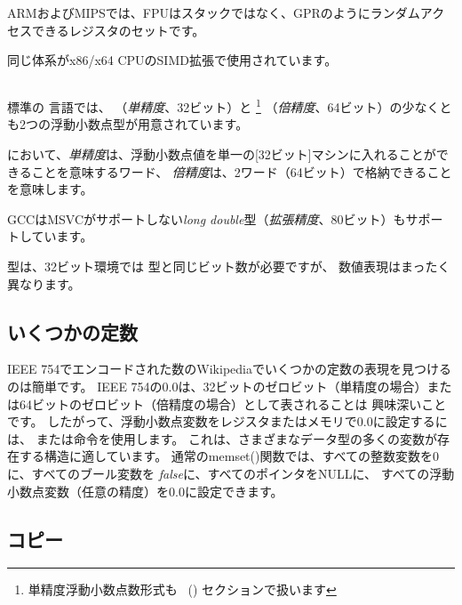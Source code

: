 ARMおよびMIPSでは、FPUはスタックではなく、\ac{GPR}のようにランダムアクセスできるレジスタのセットです。

同じ体系がx86/x64 CPUのSIMD拡張で使用されています。

\subsection{\CCpp}


標準の \CCpp 言語では、 \Tfloat （\emph{単精度}、32ビット）と 
\footnote{単精度浮動小数点数形式も 
\emph{\WorkingWithFloatAsWithStructSubSubSectionName}~() セクションで扱います}
\Tdouble （\emph{倍精度}、64ビット）の少なくとも2つの浮動小数点型が用意されています。

において、\emph{単精度}は、浮動小数点値を単一の[32ビット]マシンに入れることができることを意味するワード、
\emph{倍精度}は、2ワード（64ビット）で格納できることを意味します。


GCCはMSVCがサポートしない\emph{long double}型（\emph{拡張精度}、80ビット）もサポートしています。

\Tfloat 型は、32ビット環境では \Tint 型と同じビット数が必要ですが、
数値表現はまったく異なります。





\subsection{いくつかの定数}

IEEE 754でエンコードされた数のWikipediaでいくつかの定数の表現を見つけるのは簡単です。 
IEEE 754の0.0は、32ビットのゼロビット（単精度の場合）または64ビットのゼロビット（倍精度の場合）として表されることは
興味深いことです。
したがって、浮動小数点変数をレジスタまたはメモリで0.0に設定するには、 \MOV または命令を使用します。
これは、さまざまなデータ型の多くの変数が存在する構造に適しています。
通常のmemset()関数では、すべての整数変数を0に、すべてのブール変数を \emph{false}に、すべてのポインタをNULLに、
すべての浮動小数点変数（任意の精度）を0.0に設定できます。

\subsection{コピー}

